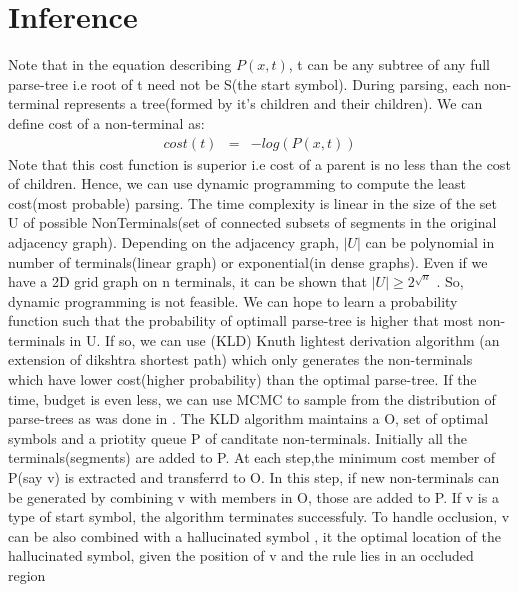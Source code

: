\documentclass[11pt]{article} %
\begin{document}
\section{Inference}
Note that in the equation describing $P(x,t)$, t can be any subtree of any full parse-tree i.e root of t need not be S(the start symbol). During parsing, each non-terminal represents a tree(formed by it's children and their children). We can define cost of a non-terminal as:
\begin{eqnarray}
cost(t)&=&-log(P(x,t))
\end{eqnarray}
 Note that this cost function is superior i.e cost of a parent is no less than the cost of children. Hence, we can use dynamic programming to compute the least cost(most probable) parsing. The time complexity is linear in the size of the set U of possible NonTerminals(set of connected subsets of segments in the original adjacency graph). Depending on the adjacency graph, $|U|$ can be polynomial in number of terminals(linear graph) or exponential(in dense graphs). Even if we have a 2D grid graph on n terminals, it can be shown that $|U|\ge 2^{\sqrt{n}}$ . So, dynamic programming is not feasible. We can hope to learn a probability function such that the probability of optimall parse-tree is higher that most non-terminals in U. If so, we can use (KLD) Knuth lightest derivation algorithm (an extension of dikshtra shortest path) which only generates the non-terminals which have lower cost(higher probability) than the optimal parse-tree. If the time, budget is even less, we can use MCMC to sample from the distribution of parse-trees as was done in \cite{zhu2011}. The KLD algorithm maintains a O, set of optimal symbols and a priotity queue P of canditate non-terminals.  Initially all the terminals(segments) are added to P.  At each step,the minimum cost member of P(say v) is extracted and transferrd to O. In this step, if new non-terminals can be generated by combining v with members in O, those are added to P. If v is a type of start symbol, the algorithm terminates successfuly. To handle occlusion, v can be also combined with a hallucinated symbol , it the optimal location of the hallucinated symbol, given the position of v and the rule lies in an occluded region
\end{document}
